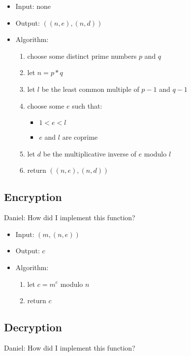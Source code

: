 \begin{itemize}
\item Input: none
\item Output: $((n, e), (n, d))$
\item Algorithm:
  \begin{enumerate}
  \item choose some distinct prime numbers $p$ and $q$
  \item let $n = p * q$
  \item let $l$ be the least common multiple of
    $p - 1$ and $q - 1$
  \item choose some $e$ such that:
  \begin{itemize}
    \item $1 < e < l$
    \item $e$ and $l$ are coprime
  \end{itemize}
  \item let $d$ be the multiplicative inverse of $e$
    modulo $l$
  \item return $((n, e), (n, d))$
  \end{enumerate}
\end{itemize}


\subsection{Encryption}

Daniel:
How did I implement this function?

\begin{itemize}
\item Input: $(m, (n, e))$
\item Output: $c$
\item Algorithm:
  \begin{enumerate}
  \item let $c = m^e$ modulo $n$
  \item return $c$
  \end{enumerate}
\end{itemize}


\subsection{Decryption}

Daniel:
How did I implement this function?

